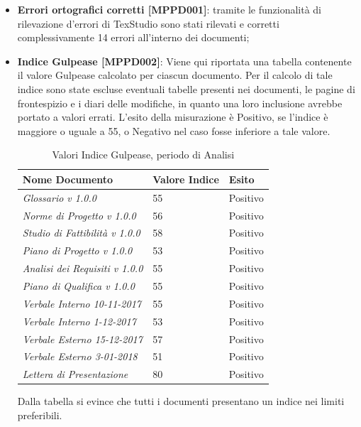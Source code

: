 \documentclass[openany,12pt,a4paper]{report}
\begin{document}
\begin{itemize}
	\item \textbf{Errori ortografici corretti [MPPD001]}: tramite le funzionalità di rilevazione d'errori di TexStudio sono stati rilevati e corretti complessivamente 14 errori all'interno dei documenti;
	
	\item \textbf{Indice Gulpease [MPPD002]}: Viene qui riportata una tabella contenente il valore Gulpease calcolato per ciascun documento.
	Per il calcolo di tale indice sono state escluse eventuali tabelle presenti nei documenti, le pagine di frontespizio e i diari delle modifiche, in quanto una loro inclusione avrebbe portato a valori errati. L'esito della misurazione è Positivo, se l'indice è maggiore o uguale a 55, o Negativo nel caso fosse inferiore a tale valore.
	
	\begin{table}
		\begin{center}
			\setlength\LTleft{6mm}
			\begin{longtable}{|p{60mm}|p{30mm}|p{25mm}|}
				\hline  
				\textbf{Nome Documento} & \textbf{Valore Indice} & \textbf{Esito} \\ \hline    
				\textit{Glossario v 1.0.0} & 55 & Positivo\\ \hline    
				\textit{Norme di Progetto v 1.0.0} & 56 & Positivo\\ \hline    
				\textit{Studio di Fattibilità v 1.0.0} & 58 & Positivo\\ \hline    
				\textit{Piano di Progetto v 1.0.0} & 53 & Positivo\\ \hline    
				\textit{Analisi dei Requisiti v 1.0.0} & 55 & Positivo\\ \hline    
				\textit{Piano di Qualifica v 1.0.0} & 55 & Positivo\\ \hline    
				\textit{Verbale Interno 10-11-2017} & 55 & Positivo\\ \hline    
				\textit{Verbale Interno 1-12-2017} & 53 & Positivo\\ \hline    
				\textit{Verbale Esterno 15-12-2017} & 57 & Positivo\\ \hline    
				\textit{Verbale Esterno 3-01-2018} & 51 & Positivo\\ \hline   
				\textit{Lettera di Presentazione} & 80 & Positivo\\ \hline
			\end{longtable}
		\end{center}
		\caption{Valori Indice Gulpease, periodo di Analisi} 
	\end{table} 

Dalla tabella si evince che tutti i documenti presentano un indice nei limiti preferibili.

\end{itemize}
\end{document}
